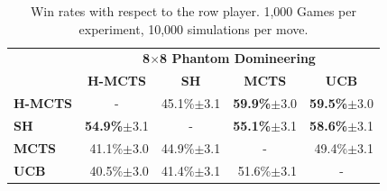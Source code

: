 \documentclass[a4paper]{llncs}
\begin{document}
\begin{table}[ht]
\begin{tabular}{@{}lrrrr@{}}
\toprule
& \multicolumn{4}{c}{\textbf{8$\times$8 Phantom Domineering}}       \\
& \multicolumn{1}{c}{\textbf{H-MCTS}} & \multicolumn{1}{c}{\textbf{SH}} & \multicolumn{1}{c}{\textbf{MCTS}} & \multicolumn{1}{c}{\textbf{UCB}} \\ [1mm] \cmidrule(l){2-5} 
\textbf{H-MCTS} & \multicolumn{1}{c}{-}		& 45.1\%$\pm$3.1			& \textbf{59.9\%}$\pm$3.0 	& \textbf{59.5\%}$\pm$3.0 		\\[.5mm] 
\textbf{SH}     & \textbf{54.9\%}$\pm$3.1	& \multicolumn{1}{c}{-}		& \textbf{55.1\%}$\pm$3.1	& \textbf{58.6\%}$\pm$3.1 		\\[.5mm] 
\textbf{MCTS}   & 41.1\%$\pm$3.0			& 44.9\%$\pm$3.1			& \multicolumn{1}{c}{-} 	& 49.4\%$\pm$3.1  				\\[.5mm] 
\textbf{UCB}	& 40.5\%$\pm$3.0			& 41.4\%$\pm$3.1			& 51.6\%$\pm$3.1			& \multicolumn{1}{c}{-} 		\\[.5mm] \bottomrule
\end{tabular}

\vspace{2mm}
{\caption{Win rates with respect to the row player. 1,000 Games per experiment, 10,000 simulations per move.} \label{tab:results_10k}}
\end{table}
\end{document}

